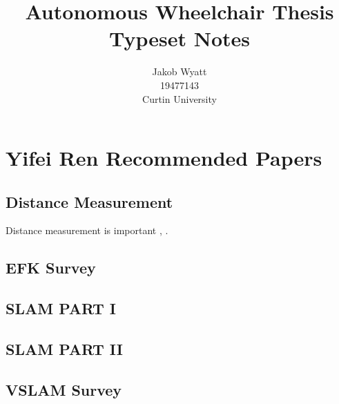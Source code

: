 \documentclass{article}
\title{Autonomous Wheelchair Thesis\\Typeset Notes}
\author{Jakob Wyatt\\19477143\\Curtin University}
\begin{document}
\maketitle
\pagebreak
\section{Yifei Ren Recommended Papers}
\subsection{Distance Measurement}
Distance measurement is important \cite{tomariEnhancingWheelchairControl2014}, \cite{distance_measurement}.

\subsection{EFK Survey}
\subsection{SLAM PART I}
\subsection{SLAM PART II}
\subsection{VSLAM Survey}

\pagebreak
\printbibliography
\end{document}
